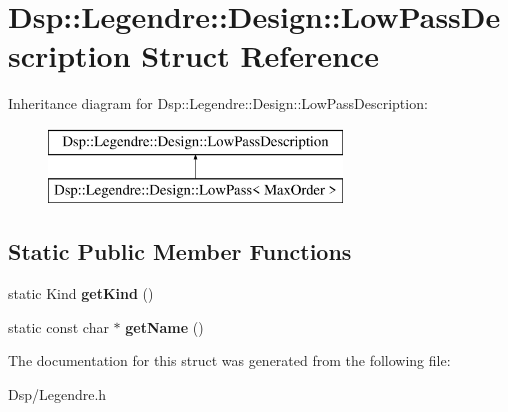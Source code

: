 \hypertarget{structDsp_1_1Legendre_1_1Design_1_1LowPassDescription}{\section{Dsp\-:\-:Legendre\-:\-:Design\-:\-:Low\-Pass\-Description Struct Reference}
\label{structDsp_1_1Legendre_1_1Design_1_1LowPassDescription}
}
Inheritance diagram for Dsp\-:\-:Legendre\-:\-:Design\-:\-:Low\-Pass\-Description\-:\begin{figure}[H]
\begin{center}
\leavevmode
\includegraphics[height=2.000000cm]{structDsp_1_1Legendre_1_1Design_1_1LowPassDescription}
\end{center}
\end{figure}
\subsection*{Static Public Member Functions}
\begin{DoxyCompactItemize}
\item 
\hypertarget{structDsp_1_1Legendre_1_1Design_1_1LowPassDescription_ae3d447249795ac624a5e6d272298eafa}{static Kind {\bfseries get\-Kind} ()}\label{structDsp_1_1Legendre_1_1Design_1_1LowPassDescription_ae3d447249795ac624a5e6d272298eafa}

\item 
\hypertarget{structDsp_1_1Legendre_1_1Design_1_1LowPassDescription_af2a1a3affed87ed3fb6279310fcc90b6}{static const char $\ast$ {\bfseries get\-Name} ()}\label{structDsp_1_1Legendre_1_1Design_1_1LowPassDescription_af2a1a3affed87ed3fb6279310fcc90b6}

\end{DoxyCompactItemize}


The documentation for this struct was generated from the following file\-:\begin{DoxyCompactItemize}
\item 
Dsp/Legendre.\-h\end{DoxyCompactItemize}
